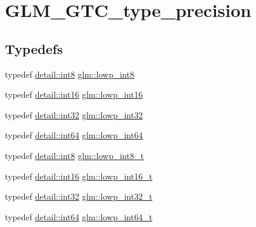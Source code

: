 \hypertarget{group__gtc__type__precision}{}\section{G\+L\+M\+\_\+\+G\+T\+C\+\_\+type\+\_\+precision}
\label{group__gtc__type__precision}
\subsection*{Typedefs}
\begin{DoxyCompactItemize}
\item 
typedef \hyperlink{namespaceglm_1_1detail_a04b526a8d7a9b455602a0afa78c531e0}{detail\+::int8} \hyperlink{group__gtc__type__precision_gaf9e675b6392764242ae87eb179e9d3d6}{glm\+::lowp\+\_\+int8}
\item 
typedef \hyperlink{namespaceglm_1_1detail_a375938874ca4f0a0982ec6373b56117b}{detail\+::int16} \hyperlink{group__gtc__type__precision_ga71fc0c399fa4780507748b643733f153}{glm\+::lowp\+\_\+int16}
\item 
typedef \hyperlink{namespaceglm_1_1detail_a9f85b4efeca416cdcec2fd08939a2e17}{detail\+::int32} \hyperlink{group__gtc__type__precision_gad9939c9d6fec1c6accc02a83c6500f08}{glm\+::lowp\+\_\+int32}
\item 
typedef \hyperlink{namespaceglm_1_1detail_a5b1c3227ec636c24a0676746381adfc8}{detail\+::int64} \hyperlink{group__gtc__type__precision_gab8a8e75af347592406e41b3ae2c0712b}{glm\+::lowp\+\_\+int64}
\item 
typedef \hyperlink{namespaceglm_1_1detail_a04b526a8d7a9b455602a0afa78c531e0}{detail\+::int8} \hyperlink{group__gtc__type__precision_gae6092311f6970a305c2df19a372360a3}{glm\+::lowp\+\_\+int8\+\_\+t}
\item 
typedef \hyperlink{namespaceglm_1_1detail_a375938874ca4f0a0982ec6373b56117b}{detail\+::int16} \hyperlink{group__gtc__type__precision_gae34c3d53c4c1434fc9f26538b0185667}{glm\+::lowp\+\_\+int16\+\_\+t}
\item 
typedef \hyperlink{namespaceglm_1_1detail_a9f85b4efeca416cdcec2fd08939a2e17}{detail\+::int32} \hyperlink{group__gtc__type__precision_gad9567c806dc39f534174eef42663119d}{glm\+::lowp\+\_\+int32\+\_\+t}
\item 
typedef \hyperlink{namespaceglm_1_1detail_a5b1c3227ec636c24a0676746381adfc8}{detail\+::int64} \hyperlink{group__gtc__type__precision_ga14d72e76d57c7f28eca8e933816c9fd6}{glm\+::lowp\+\_\+int64\+\_\+t}
\item 

\end{DoxyCompactItemize}
